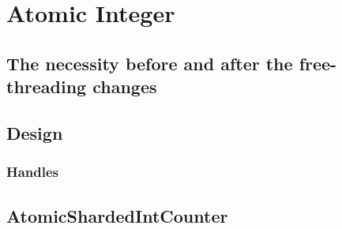 \chapter{Atomic Integer}

\section{The necessity before and after the free-threading changes}

\section{Design}
\subsection{Handles}

\section{AtomicShardedIntCounter}\label{sec:atomicshardedintcounter}
